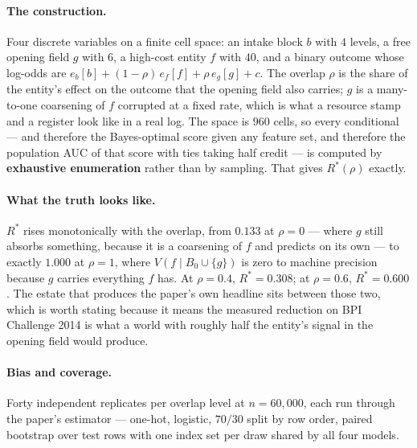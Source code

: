 \documentclass[preprint,12pt]{elsarticle}
\begin{document}
\paragraph{The construction.} Four discrete variables on a finite cell space:
an intake block $b$ with $4$ levels, a free opening field $g$ with $6$, a
high-cost entity $f$ with $40$, and a binary outcome whose log-odds are
$e_b[b] + (1-\rho)\,e_f[f] + \rho\,e_g[g] + c$. The overlap $\rho$ is the share
of the entity's effect on the outcome that the opening field also carries;
$g$ is a many-to-one coarsening of $f$ corrupted at a fixed rate, which is what
a resource stamp and a register look like in a real log. The space is
$960$ cells, so every conditional --- and therefore the Bayes-optimal score
given any feature set, and therefore the population AUC of that score with
ties taking half credit --- is computed by \textbf{exhaustive enumeration}
rather than by sampling. That gives $R^{*}(\rho)$ exactly.

\paragraph{What the truth looks like.} $R^{*}$ rises monotonically with the
overlap, from $0.133$ at $\rho = 0$ --- where $g$ still absorbs something,
because it is a coarsening of $f$ and predicts on its own --- to exactly
$1.000$ at $\rho = 1$, where $V(f \mid B_0 \cup \{g\})$ is zero to machine
precision because $g$ carries everything $f$ has. At $\rho = 0.4$,
$R^{*} = 0.308$; at $\rho = 0.6$, $R^{*} = 0.600$. The estate that produces
the paper's own headline sits between those two, which is worth stating
because it means the measured reduction on BPI Challenge 2014 is what a world
with roughly half the entity's signal in the opening field would produce.

\paragraph{Bias and coverage.} Forty independent replicates per overlap level
at $n = 60{,}000$, each run through the paper's estimator --- one-hot,
logistic, $70/30$ split by row order, paired bootstrap over test rows with one
index set per draw shared by all four models.
\end{document}
